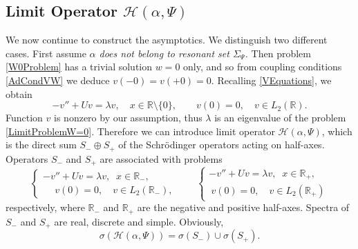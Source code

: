 \documentclass[11pt,english]{amsart}%
\begin{document}
\subsection{Limit Operator $\mathcal{H}(\alpha,\Psi)$}\label{SubsecLimitOperator}
 We now continue to construct the asymptotics. We distinguish two different cases.
First assume  \emph{$\alpha$ does not belong to  resonant set $\Sigma_\Psi$.}
Then problem \eqref{W0Problem} has  a trivial solution $w=0$ only, and so from  coupling conditions \eqref{AdCondVW} we deduce $v(-0)=v(+0)=0$.  Recalling \eqref{VEquations}, we obtain
\begin{equation}\label{LimitProblemW=0}
 - v''+Uv=\lambda v,\quad x\in\mathbb{R}\setminus\{0\}, \qquad v(0)=0, \quad v\in L_2(\mathbb{R}).
\end{equation}
Function $v$  is nonzero by our assumption, thus $\lambda$ is an eigenvalue of the problem \eqref{LimitProblemW=0}.
Therefore we can introduce limit operator $\mathcal{H}(\alpha,\Psi)$, which is the direct sum $S_-\oplus S_+$
of the Schr\"{o}dinger operators acting on half-axes. Operators $S_-$ and $S_+$ are associated with problems
\begin{equation}\label{AxisProblem}
\begin{cases}
   -v''+Uv=\lambda v,\;\; x\in \mathbb{R}_-,\\
   \phantom{-}v(0)=0, \quad v\in L_2(\mathbb{R}_-),
\end{cases}\qquad
\begin{cases}
   -v''+Uv=\lambda v,\;\; x\in \mathbb{R}_+,\\
   \:v(0)=0, \quad v\in L_2(\mathbb{R}_+)
\end{cases}
\end{equation}
respectively, where $\mathbb{R}_-$ and $\mathbb{R}_+$ are the negative and positive half-axes.
Spectra of  $S_-$ and $S_+$ are real, discrete and simple. Obviously, $$\sigma(\mathcal{H}(\alpha,\Psi))=\sigma(S_-)\cup\sigma(S_+).$$
\end{document}
